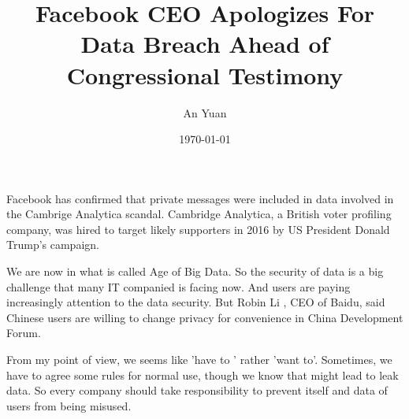 \documentclass[a4paper,12pt]{article}
\begin{document}
\title{Facebook CEO Apologizes For Data Breach Ahead of Congressional Testimony}
\author{An Yuan}
\date{\today}
\maketitle
Facebook has confirmed that private messages were included in data involved in the Cambrige Analytica scandal. Cambridge Analytica, a British voter profiling company, was hired to target likely supporters in 2016 by US President Donald Trump's campaign.
\par
We are now in what is called Age of Big Data. So the security of data is a big challenge that many IT companied is facing now. And users are paying increasingly attention to the data security. But Robin Li , CEO of Baidu, said Chinese users are willing to change privacy for convenience in China Development Forum. 
\par
From my point of view, we seems like 'have to ' rather 'want to'. Sometimes, we have to agree some rules for normal use, though we know that might lead to leak data. So every company should take responsibility to prevent itself and data of users from being misused. 
\end{document}
